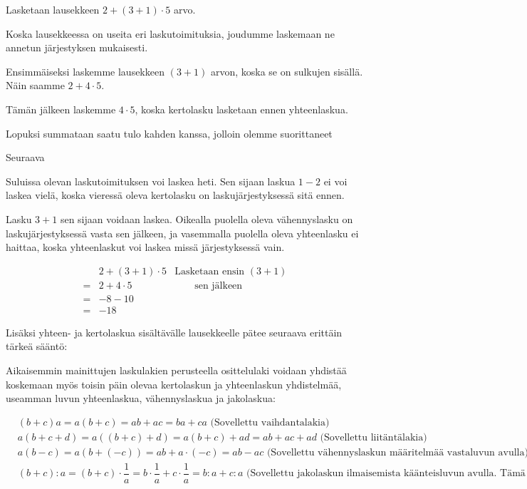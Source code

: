 \begin{esimerkki}
Lasketaan lausekkeen $2+(3+1)\cdot 5$ arvo.

Koska lausekkeessa on useita eri laskutoimituksia, joudumme laskemaan ne annetun järjestyksen mukaisesti.

Ensimmäiseksi laskemme lausekkeen $(3+1)$ arvon, koska se on sulkujen sisällä. Näin saamme $2+4\cdot 5$.

Tämän jälkeen laskemme $4\cdot 5$, koska kertolasku lasketaan ennen yhteenlaskua. 

Lopuksi summataan saatu tulo kahden kanssa, jolloin olemme suorittaneet 

Seuraava

Suluissa olevan laskutoimituksen voi laskea heti. Sen sijaan laskua $1-2$ ei voi laskea vielä,
koska vieressä oleva kertolasku on laskujärjestyksessä sitä ennen. %

Lasku $3+1$ sen sijaan voidaan laskea. Oikealla puolella oleva vähennyslasku on
laskujärjestyksessä vasta sen jälkeen, ja vasemmalla puolella oleva yhteenlasku ei haittaa,
koska yhteenlaskut voi laskea missä järjestyksessä vain.

\begin{align*}
   &2+(3+1)\cdot 5&\textrm{Lasketaan ensin } (3+1)
\\=&2+4\cdot5&\qquad\textrm{sen jälkeen }
\\=&-8-10&
\\=&-18&
\end{align*}
\end{esimerkki}

Lisäksi yhteen- ja kertolaskua sisältävälle lausekkeelle pätee seuraava erittäin tärkeä sääntö:


Aikaisemmin mainittujen laskulakien perusteella osittelulaki voidaan yhdistää koskemaan myös toisin päin olevaa kertolaskun ja yhteenlaskun yhdistelmää, useamman luvun yhteenlaskua, vähennyslaskua ja jakolaskua:

\begin{align*}
&(b+c)a = a(b+c) = ab+ac = ba+ca \text{ (Sovellettu vaihdantalakia)} \\
&a(b+c+d) = a((b+c)+d) = a(b+c)+ad = ab+ac+ad \text{ (Sovellettu liitäntälakia)} \\
&a(b-c) = a(b+(-c))=ab+a\cdot(-c)=ab-ac \text{ (Sovellettu vähennyslaskun määritelmää vastaluvun avulla)} \\
&(b+c):a = (b+c)\cdot\dfrac1a = b\cdot\dfrac1a+c\cdot\dfrac1a = b:a+c:a \text{ (Sovellettu jakolaskun ilmaisemista käänteisluvun avulla. Tämä ominaisuus esitellään myöhemmin rationaalilukujen yhteydessä.) }
\end{align*}

